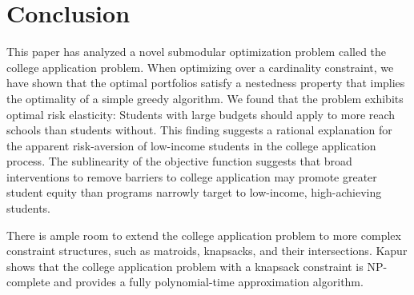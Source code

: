 \section{Conclusion} \label{sectionConclusion}

This paper has analyzed a novel submodular optimization problem called the college application problem. When optimizing over a cardinality constraint, we have shown that the optimal portfolios satisfy a nestedness property that implies the optimality of a simple greedy algorithm. We found that the problem exhibits optimal risk elasticity: Students with large budgets should apply to more reach schools than students without. This finding suggests a rational explanation for the apparent risk-aversion of low-income students in the college application process. The sublinearity of the objective function suggests that broad interventions to remove barriers to college application may promote greater student equity than programs narrowly target to low-income, high-achieving students.

There is ample room to extend the college application problem to more complex constraint structures, such as matroids, knapsacks, and their intersections. Kapur \cite{kapur2022} shows that the college application problem with a knapsack constraint is NP-complete and provides a fully polynomial-time approximation algorithm.

